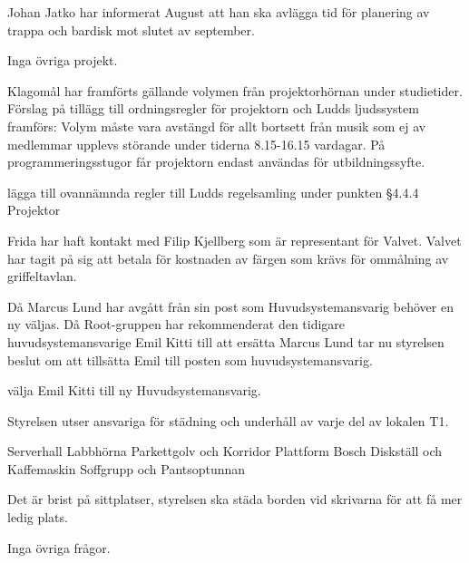 \documentclass{protokoll}
\begin{document}
Johan Jatko har informerat August att han ska avlägga tid för planering av trappa och bardisk mot slutet av september.

Inga övriga projekt.

Klagomål har framförts gällande volymen från projektorhörnan under studietider. Förslag på tillägg till ordningsregler för projektorn och Ludds ljudssystem framförs: 
Volym måste vara avstängd för allt bortsett från musik som ej av medlemmar upplevs störande under tiderna 8.15-16.15 vardagar. 
På programmeringsstugor får projektorn endast användas för utbildningssyfte.

\begin{beslut}
    \att lägga till ovannämnda regler till Ludds regelsamling under punkten §4.4.4 Projektor
\end{beslut}

Frida har haft kontakt med Filip Kjellberg som är representant för Valvet. Valvet har tagit på sig att betala för kostnaden av färgen som krävs för ommålning av griffeltavlan. 

Då Marcus Lund har avgått från sin post som Huvudsystemansvarig behöver en ny väljas. Då Root-gruppen har rekommenderat den tidigare huvudsystemansvarige Emil Kitti till att ersätta Marcus Lund tar nu styrelsen beslut om att tillsätta Emil till posten som huvudsystemansvarig. 
\begin{beslut}
    \att välja Emil Kitti till ny Huvudsystemansvarig.
\end{beslut}

Styrelsen utser ansvariga för städning och underhåll av varje del av lokalen T1. 
\begin{list}
    \entry[Kitti] Serverhall 
    \entry[Jens] Labbhörna
    \entry[Frida] Parkettgolv och Korridor
    \entry[Fredrik] Plattform
    \entry[August] Bosch
    \entry[Anton] Diskställ och Kaffemaskin
    \entry[Edvin] Soffgrupp och Pantsoptunnan
\end{list}

Det är brist på sittplatser, styrelsen ska städa borden vid skrivarna för att få mer ledig plats.

Inga övriga frågor.
\end{document}
